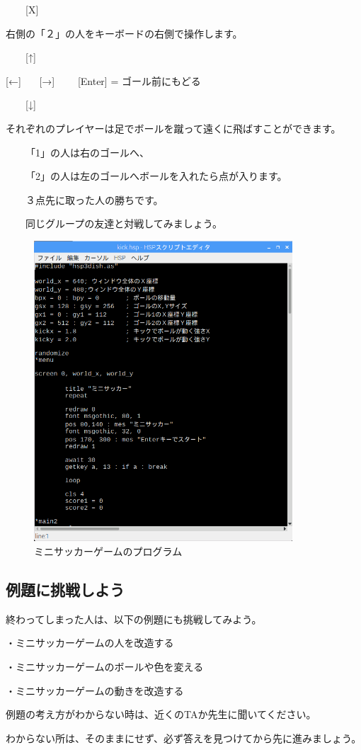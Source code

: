 \ \ \ \ [X]



右側の「２」の人をキーボードの右側で操作します。




\ \ \ \ [↑]

[←] \ \ \ [→] \ \ \ \ [Enter] = ゴール前にもどる

\ \ \ \ [↓]




それぞれのプレイヤーは足でボールを蹴って遠くに飛ばすことができます。

\ \ \ \ 「1」の人は右のゴールへ、

\ \ \ \ 「2」の人は左のゴールへボールを入れたら点が入ります。


\ \ \ \ ３点先に取った人の勝ちです。

\ \ \ \ 同じグループの友達と対戦してみましょう。



\begin{figure}[H]
    \begin{center}
      \includegraphics[keepaspectratio,width=9.657cm,height=11.229cm]{text04-img/s_kicksrc.png}
      \caption{ミニサッカーゲームのプログラム}
    \end{center}
    \label{fig:prog_menu}
\end{figure}


\newpage
\subsection{例題に挑戦しよう}

終わってしまった人は、以下の例題にも挑戦してみよう。


・ミニサッカーゲームの人を改造する

・ミニサッカーゲームのボールや色を変える

・ミニサッカーゲームの動きを改造する



例題の考え方がわからない時は、近くのTAか先生に聞いてください。

わからない所は、そのままにせず、必ず答えを見つけてから先に進みましょう。


